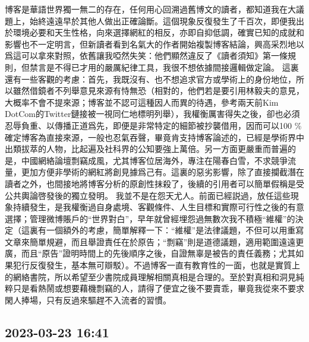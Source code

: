 \documentclass[twocolumn]{ctexart}
\begin{document}
博客是華語世界獨一無二的存在，任何用心回溯過舊博文的讀者，都知道我在大議題上，始終遠遠早於其他人做出正確論斷。這個現象反復發生了千百次，即便我出於環境必要和天生性格，向來選擇網紅的相反，亦即自抑低調，確實已知的成就和影響也不一定明言，但新讀者看到名氣大的作者開始複製博客結論，興高采烈地以爲這可以拿來對照，依舊讓我啞然失笑：他們顯然違反了《讀者須知》第一條規則，但禁言是不得已才用的嚴厲紀律工具，我很不想依據間接邏輯做定論。
這裏還有一些客觀的考慮：首先，我既沒有、也不想追求官方或學術上的身份地位，所以雖然借鏡者不列舉意見來源有恃無恐（相對的，他們若是要引用林毅夫的意見，大概率不會不提來源；博客並不認可這種因人而異的待遇，參考兩天前Kim DotCom的Twitter鏈接被一視同仁地標明列舉），我權衡厲害得失之後，卻也必須忍辱負重、以傳播正道爲先，即便是非常特定的細節被抄襲借用，因而可以100 \% 確定博客為直接來源，一般也忍氣吞聲，畢竟肯支持博客論述的，已經是學術界中出類拔萃的人物，比起遍及社科界的公知要強上萬倍。另一方面更嚴重而普遍的是，中國網絡論壇剽竊成風，尤其博客位居海外，專注在陽春白雪，不求競爭流量，更加方便非學術的網紅將創見據爲己有。這裏的惡劣影響，除了直接攔截潛在讀者之外，也間接地將博客分析的原創性抹殺了，後續的引用者可以簡單假稱是受公共輿論啓發後的獨立發明。
我並不是在怨天尤人。前面已經説過，放任這些現象持續發生，是我權衡過自身處境、客觀條件、人生目標和實際可行性之後的有意選擇；管理微博賬戶的“世界對白”，早年就曾經埋怨過無數次我不積極“維權”的決定（這裏有一個額外的考慮，簡單解釋一下：“維權”是法律議題，不但可以用重寫文章來簡單規避，而且舉證責任在於原告；“剽竊”則是道德議題，適用範圍遠遠更廣，而且“原告”證明時間上的先後順序之後，自證無辜是被告的責任義務；尤其如果犯行反復發生，基本無可辯駁）。不過博客一直有教育性的一面，也就是實質上的網絡書院，所以希望至少書院成員理解相關真相是合理的。至於對真相和洞見純粹只是看熱鬧或想要藉機剽竊的人，請得了便宜之後不要賣乖，畢竟我從來不要求閑人捧場，只有反過來驅趕不入流者的習慣。
\subsection*{2023-03-23 16:41}
\end{document}
